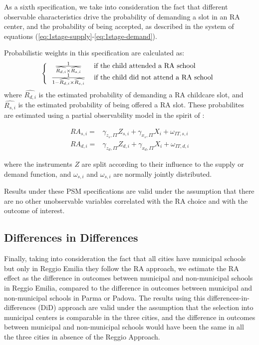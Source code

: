 \documentclass[12pt]{article}
\begin{document}
\medskip

As a sixth specification, we take into consideration the fact that different
observable characteristics drive the probability of demanding a slot in an
RA center, and the probability of being accepted, as described in the system
of equations (\ref{eq:1stage-supply}-\ref{eq:1stage-demand}).

Probabilistic weights in this specification are calculated as: 
\begin{equation*}
\left\{ 
\begin{tabular}{cl}
$\frac{1}{ \widehat{R_{d,i}} \times \widehat{R_{s,i}}}$ & if the child
attended a RA school \\ 
$\frac{1}{1-\widehat{R_{d,i}} \times \widehat{R_{s,i}}}$ & if the child did
not attend a RA school%
\end{tabular}
\right.
\end{equation*}
where $\widehat{R_{d,i}}$ is the estimated probability of demanding a RA
childcare slot, and $\widehat{R_{s,i}}$ is the estimated probability of
being offered a RA slot. These probabilites are estimated using a partial
observability model in the spirit of \cite{Poirier1980}:

\begin{align*}
RA_{s,i} = & \gamma_{z_{s},IT} Z_{s,i} + \gamma_{x_{s},IT} X_{i} +
\omega_{IT,s,i} \\
RA_{d,i} = & \gamma_{z_{d},IT} Z_{d,i} + \gamma_{x_{d},IT} X_{i} +
\omega_{IT,d,i}
\end{align*}

where the instruments $Z$ are split according to their influence to the
supply or demand function, and $\omega_{s,i}$ and $\omega_{s,i}$ are
normally jointly distributed.

Results under these PSM specifications are valid under the assumption that
there are no other unobservable variables correlated with the RA choice and
with the outcome of interest.

\subsection{Differences in Differences}

Finally, taking into consideration the fact that all cities have municipal
schools but only in Reggio Emilia they follow the RA approach, we estimate
the RA effect as the difference in outcomes between municipal and
non-municipal schools in Reggio Emilia, compared to the difference in
outcomes between municipal and non-municipal schools in Parma or Padova. The
results using this differences-in-differences (DiD) approach are valid under
the assumption that the selection into municipal centers is comparable in
the three cities, and the difference in outcomes between municipal and
non-municipal schools would have been the same in all the three cities in
absence of the Reggio Approach.
\end{document}
